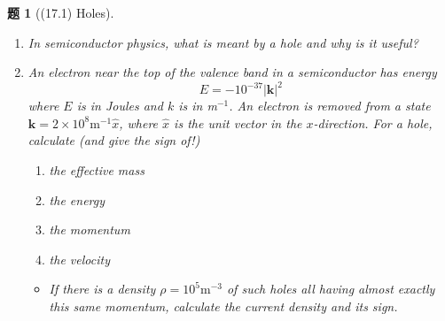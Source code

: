 \documentclass[UTF8,10pt,a4paper]{article}
\theoremstyle{Problem}
\newtheorem{prob}{题}
\theoremstyle{Solution}
\providecommand{\abs}[1]{\left\lvert#1\right\rvert}
\begin{document}
\thispagestyle{FirstPageStyle}
\begin{prob}[(17.1) Holes]
    \begin{enumerate}
        \item[(a)] In semiconductor physics, what is meant by a hole and why is it useful?
        \item[(b)] An electron near the top of the valence band in a semiconductor has energy
        \[
            E=-10^{-37}\abs{\bm{k}}^2
        \]
        where $E$ is in Joules and $k$ is in m$^{-1}$. An electron is removed from a state $\bm{k}=2\times 10^8\text{m}^{-1}\hat{x}$, where $\hat{x}$ is the unit vector in the $x$-direction. For a hole, calculate (and give the sign of!)
        \begin{enumerate}
            \item[(i)] the effective mass
            \item[(ii)] the energy
            \item[(iii)] the momentum
            \item[(iv)] the velocity
        \end{enumerate}
        \begin{itemize}
            \item[$\triangleright$] If there is a density $\rho=10^5\text{m}^{-3}$ of such holes all having almost exactly this same momentum, calculate the current density and its sign.
        \end{itemize}
    \end{enumerate}
\end{prob}
\end{document}
